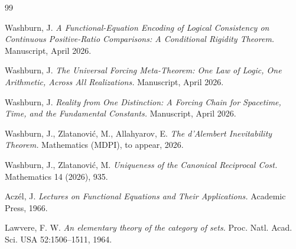 \documentclass[11pt,a4paper]{article}
\theoremstyle{definition}
\theoremstyle{remark}
\begin{document}
\begin{thebibliography}{99}

Washburn, J.
\emph{A Functional-Equation Encoding of Logical Consistency on
Continuous Positive-Ratio Comparisons: A Conditional Rigidity Theorem.}
Manuscript, April 2026.

Washburn, J.
\emph{The Universal Forcing Meta-Theorem:
One Law of Logic, One Arithmetic, Across All Realizations.}
Manuscript, April 2026.

Washburn, J.
\emph{Reality from One Distinction:
A Forcing Chain for Spacetime, Time, and the Fundamental Constants.}
Manuscript, April 2026.

Washburn, J., Zlatanović, M., Allahyarov, E.
\emph{The d'Alembert Inevitability Theorem.}
Mathematics (MDPI), to appear, 2026.

Washburn, J., Zlatanović, M.
\emph{Uniqueness of the Canonical Reciprocal Cost.}
Mathematics 14 (2026), 935.

Aczél, J.
\emph{Lectures on Functional Equations and Their Applications.}
Academic Press, 1966.

Lawvere, F. W.
\emph{An elementary theory of the category of sets.}
Proc. Natl. Acad. Sci. USA 52:1506--1511, 1964.

\end{thebibliography}
\end{document}
